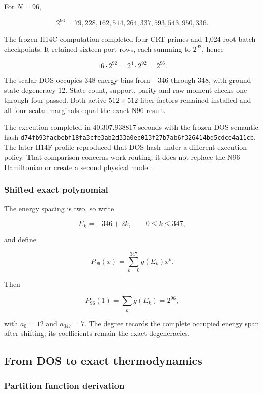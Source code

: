 For \(N=96\),

\[
2^{96}=79{,}228{,}162{,}514{,}264{,}337{,}593{,}543{,}950{,}336.
\]

The frozen H14C computation completed four CRT primes and 1,024
root-batch checkpoints. It retained sixteen port rows, each summing to
\(2^{92}\), hence

\[
16\cdot2^{92}=2^4\cdot2^{92}=2^{96}.
\]

The scalar DOS occupies 348 energy bins from \(-346\) through \(348\),
with ground-state degeneracy 12. State-count, support, parity and
raw-moment checks one through four passed. Both active \(512\times512\)
fiber factors remained installed and all four scalar marginals equal the
exact N96 result.

The execution completed in 40,307.938817 seconds with the frozen DOS
semantic hash
\nolinkurl{d74fb93facbebf18fa3cfe3ab2d33a0ec013f27b7ab6f326414bd5cdce4a11cb}.
The later H14F profile reproduced that DOS hash under a different
execution policy. That comparison concerns work routing; it does not
replace the N96 Hamiltonian or create a second physical model.

\subsubsection{Shifted exact polynomial}\label{viii-ch03-shifted-exact-polynomial}

The energy spacing is two, so write

\[
E_k=-346+2k,\qquad 0\le k\le347,
\]

and define

\[
P_{96}(x)=\sum_{k=0}^{347}g(E_k)x^k.
\]

Then

\[
P_{96}(1)=\sum_kg(E_k)=2^{96},
\]

with \(a_0=12\) and \(a_{347}=7\). The degree records the complete
occupied energy span after shifting; its coefficients remain the exact
degeneracies.

\subsection{From DOS to exact
thermodynamics}\label{viii-ch03-from-dos-to-exact-thermodynamics}

\subsubsection{Partition function
derivation}\label{viii-ch03-partition-function-derivation}

